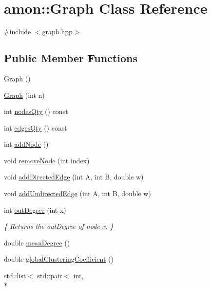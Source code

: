 \hypertarget{classamon_1_1_graph}{\section{amon\-:\-:Graph Class Reference}
\label{classamon_1_1_graph}
}


{\ttfamily \#include $<$graph.\-hpp$>$}

\subsection*{Public Member Functions}
\begin{DoxyCompactItemize}
\item 
\hyperlink{classamon_1_1_graph_a8dbd046ce57a0c624c7abe573b174ce1}{Graph} ()
\item 
\hyperlink{classamon_1_1_graph_a40dd78be5732f86fa3df8d687d0e5728}{Graph} (int n)
\item 
int \hyperlink{classamon_1_1_graph_a7c7ef2759921bb87aa8c69c28ea62f8f}{nodes\-Qty} () const 
\item 
int \hyperlink{classamon_1_1_graph_a705be004387c64a5ce5aa668b0c4e9d7}{edges\-Qty} () const 
\item 
int \hyperlink{classamon_1_1_graph_aa7f39dcf5b2fab62d0b9399bc759ff27}{add\-Node} ()
\item 
void \hyperlink{classamon_1_1_graph_af3a842a93c90db66a7f301c685e51b3a}{remove\-Node} (int index)
\item 
void \hyperlink{classamon_1_1_graph_a02016704b31a4bf3a277fb4fcb8c1d72}{add\-Directed\-Edge} (int A, int B, double w)
\item 
void \hyperlink{classamon_1_1_graph_a98b71efc14d469813b8d1c679ca22fa3}{add\-Undirected\-Edge} (int A, int B, double w)
\item 
int \hyperlink{classamon_1_1_graph_a2500d2f93404a3ce691396db4ca0ea92}{out\-Degree} (int x)
\begin{DoxyCompactList}\small\item\em \{ Returns the out\-Degree of node x. \} \end{DoxyCompactList}\item 
double \hyperlink{classamon_1_1_graph_ac97e95d56f333fa63755458cc9443cc6}{mean\-Degree} ()
\item 
double \hyperlink{classamon_1_1_graph_a6e9098ead3849a382e3a5d1949599947}{global\-Clustering\-Coefficient} ()
\item 
std\-::list$<$ std\-::pair$<$ int, \\*

\end{DoxyCompactItemize}
